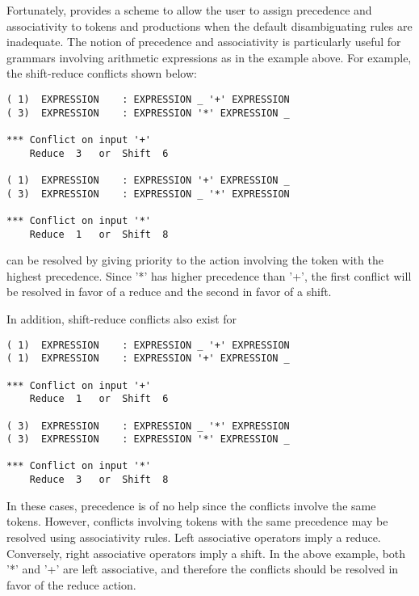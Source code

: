 Fortunately, \ayacc provides a scheme to allow the user to assign precedence
and associativity to tokens and productions when the default
disambiguating rules are inadequate.  The notion of precedence
and associativity is particularly useful for grammars involving
arithmetic expressions as in the example above.  For example, the
shift-reduce conflicts shown below:
\begin{verbatim}
( 1)  EXPRESSION	: EXPRESSION _ '+' EXPRESSION
( 3)  EXPRESSION	: EXPRESSION '*' EXPRESSION _

*** Conflict on input '+'
	Reduce  3	or	Shift  6

( 1)  EXPRESSION	: EXPRESSION '+' EXPRESSION _
( 3)  EXPRESSION	: EXPRESSION _ '*' EXPRESSION

*** Conflict on input '*'
	Reduce  1	or	Shift  8

\end{verbatim}
can be resolved by giving priority to the action involving the token with
the highest precedence.  Since '*' has higher precedence
than '+', the first conflict will be resolved in favor of a
reduce and the second in favor of a shift.

In addition, shift-reduce conflicts  also exist for
\newpage
\begin{verbatim}
( 1)  EXPRESSION	: EXPRESSION _ '+' EXPRESSION
( 1)  EXPRESSION	: EXPRESSION '+' EXPRESSION _

*** Conflict on input '+'
	Reduce  1	or	Shift  6

( 3)  EXPRESSION	: EXPRESSION _ '*' EXPRESSION
( 3)  EXPRESSION	: EXPRESSION '*' EXPRESSION _

*** Conflict on input '*'
	Reduce  3	or	Shift  8

\end{verbatim}

In these cases, precedence is of no help since the conflicts
involve the same tokens.  However, conflicts involving tokens
with the same precedence may be resolved using associativity rules.  Left
associative operators imply a reduce.  Conversely, right
associative operators imply a shift.  In the above example,
both '*' and '+' are left associative, and therefore the
conflicts should be resolved in favor of the reduce action.

